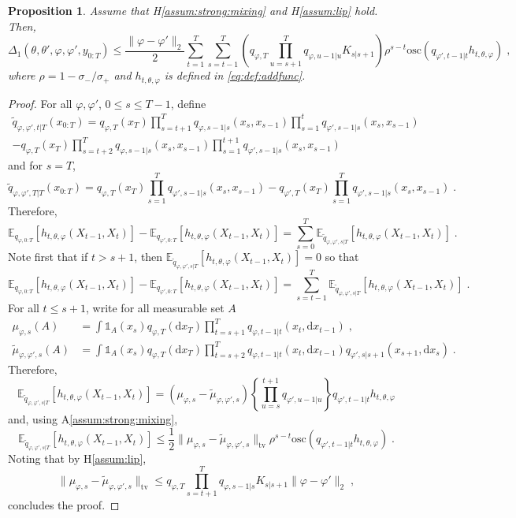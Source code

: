 \documentclass{article}
\newtheorem{proposition}[theorem]{Proposition}
\newcommand{\udlow}{\sigma_-}
\newcommand{\udup}{\sigma_+}
\newcommand{\1}{\mathbbm{1}}
\newcommand{\rmd}{\ensuremath{\mathrm{d}}}
\newcommand{\eqsp}{\;}
\begin{document}
\begin{proposition}
Assume that H\ref{assum:strong:mixing} and H\ref{assum:lip} hold. Then,
$$
\Delta_1(\theta, \theta', \varphi, \varphi', y_{0:T}) \leq \frac{\|\varphi-\varphi'\|_2}{2}\sum_{t=1}^T\sum_{s=t-1}^T \left(q_{\varphi,T}\prod_{u=s+1}^Tq_{\varphi,u-1|u}K_{s|s+1}\right) \rho^{s-t}\mathrm{osc}\left(q_{\varphi',t-1|t}h_{t,\theta,\varphi}\right) \eqsp,
$$
where $\rho = 1-\udlow/\udup$ and $h_{t,\theta,\varphi}$ is defined in \eqref{eq:def:addfunc}.
\end{proposition}
\begin{proof}
For all $\varphi,\varphi'$, $0\leq s \leq T-1$, define
\begin{multline*}
\tilde q_{\varphi,\varphi',t|T}(x_{0:T}) = q_{\varphi,T}(x_T)\prod_{s=t+1}^Tq_{\varphi,s-1|s}(x_s,x_{s-1})\prod_{s=1}^tq_{\varphi',s-1|s}(x_s,x_{s-1}) \\
- q_{\varphi,T}(x_T)\prod_{s=t+2}^Tq_{\varphi,s-1|s}(x_s,x_{s-1})\prod_{s=1}^{t+1}q_{\varphi',s-1|s}(x_s,x_{s-1})
\end{multline*}
and for $s=T$,
$$
\tilde q_{\varphi,\varphi',T|T}(x_{0:T}) = q_{\varphi,T}(x_T)\prod_{s=1}^Tq_{\varphi',s-1|s}(x_s,x_{s-1}) 
- q_{\varphi',T}(x_T)\prod_{s=1}^Tq_{\varphi',s-1|s}(x_s,x_{s-1})\eqsp.
$$
Therefore,
$$
\mathbb{E}_{q_{\varphi,0:T}}\left[h_{t,\theta,\varphi}(X_{t-1},X_t)\right] - \mathbb{E}_{q_{\varphi',0:T}}\left[h_{t,\theta,\varphi}(X_{t-1},X_t)\right] = \sum_{s=0}^T \mathbb{E}_{\tilde q_{\varphi,\varphi',s|T}}\left[h_{t,\theta,\varphi}(X_{t-1},X_t)\right] \eqsp.
$$
Note first that if $t> s+1$, then $\mathbb{E}_{\tilde q_{\varphi,\varphi',s|T}}\left[h_{t,\theta,\varphi}(X_{t-1},X_t)\right] = 0$ so that
$$
\mathbb{E}_{q_{\varphi,0:T}}\left[h_{t,\theta,\varphi}(X_{t-1},X_t)\right] - \mathbb{E}_{q_{\varphi',0:T}}\left[h_{t,\theta,\varphi}(X_{t-1},X_t)\right] = \sum_{s=t-1}^T \mathbb{E}_{\tilde q_{\varphi,\varphi',s|T}}\left[h_{t,\theta,\varphi}(X_{t-1},X_t)\right] \eqsp.
$$
For all $t\leq s+1$, write for all measurable set $A$
\begin{align*}
\mu_{\varphi,s}(A) &= \int \mathds{1}_A(x_s) q_{\varphi,T}(\rmd x_T)\prod_{t=s+1}^Tq_{\varphi,t-1|t}(x_t,\rmd x_{t-1})\eqsp,\\
\tilde\mu_{\varphi,\varphi',s}(A) &= \int \mathds{1}_A(x_s) q_{\varphi,T}(\rmd x_T)\prod_{t=s+2}^Tq_{\varphi,t-1|t}(x_t,\rmd x_{t-1})q_{\varphi',s|s+1}(x_{s+1},\rmd x_{s})\eqsp.
\end{align*}
Therefore,
$$
\mathbb{E}_{\tilde q_{\varphi,\varphi',s|T}}\left[h_{t,\theta,\varphi}(X_{t-1},X_t)\right] = \left(\mu_{\varphi,s} - \tilde\mu_{\varphi,\varphi',s}\right)\left\{\prod_{u=s}^{t+1}q_{\varphi',u-1|u}\right\}q_{\varphi',t-1|t}h_{t,\theta,\varphi}
$$
and, using A\ref{assum:strong:mixing},
$$
\mathbb{E}_{\tilde q_{\varphi,\varphi',s|T}}\left[h_{t,\theta,\varphi}(X_{t-1},X_t)\right]  \leq \frac{1}{2}\|\mu_{\varphi,s}-\tilde\mu_{\varphi,\varphi',s}\|_{\mathrm{tv}}\rho^{s-t}\mathrm{osc}\left(q_{\varphi',t-1|t}h_{t,\theta,\varphi}\right)\eqsp.
$$
Noting that by H\ref{assum:lip},
$$
\|\mu_{\varphi,s}-\tilde\mu_{\varphi,\varphi',s}\|_{\mathrm{tv}} \leq q_{\varphi,T}\prod_{s=t+1}^Tq_{\varphi,s-1|s}K_{s|s+1}\|\varphi-\varphi'\|_2\eqsp,
$$
concludes the proof.
\end{proof}
\end{document}
